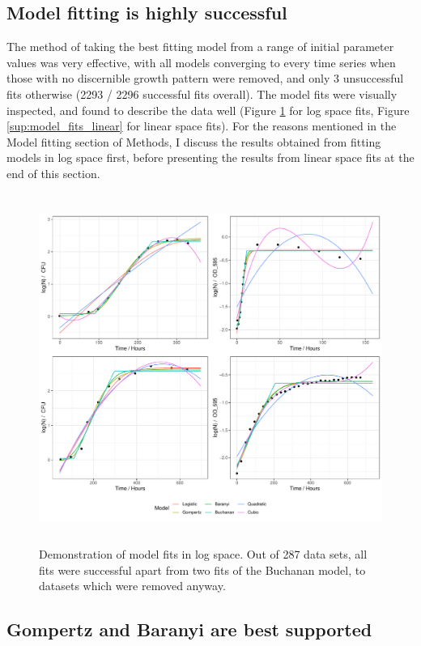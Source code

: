 \documentclass[11pt, a4paper]{article}
\begin{document}
\begin{linenumbers}
\subsection{Model fitting is highly successful}
The method of taking the best fitting model from a range of initial parameter values was very effective, with all models converging to every time series when those with no discernible growth pattern were removed, and only 3 unsuccessful fits otherwise (2293 / 2296 successful fits overall). The model fits were visually inspected, and found to describe the data well (Figure \ref{fig:model_fits} for log space fits, Figure \ref{sup:model_fits_linear} for linear space fits). For the reasons mentioned in the Model fitting section of Methods, I discuss the results obtained from fitting models in log space first, before presenting the results from linear space fits at the end of this section.

                \begin{figure}[H]
                \centering
        \includegraphics[height=4.5in]{../results/model_fits.pdf}
        \caption{Demonstration of model fits in log space. Out of 287 data sets, all fits were successful apart from two fits of the Buchanan model, to datasets which were removed anyway. }
        \label{fig:model_fits}
        \end{figure}

\subsection{Gompertz and Baranyi are best supported}


\end{linenumbers}
\end{document}
